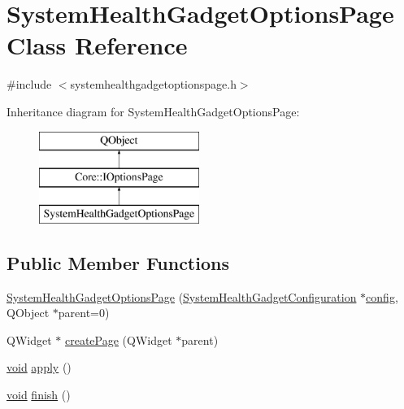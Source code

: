 \hypertarget{class_system_health_gadget_options_page}{\section{System\-Health\-Gadget\-Options\-Page Class Reference}
\label{class_system_health_gadget_options_page}
}


{\ttfamily \#include $<$systemhealthgadgetoptionspage.\-h$>$}

Inheritance diagram for System\-Health\-Gadget\-Options\-Page\-:\begin{figure}[H]
\begin{center}
\leavevmode
\includegraphics[height=3.000000cm]{class_system_health_gadget_options_page}
\end{center}
\end{figure}
\subsection*{Public Member Functions}
\begin{DoxyCompactItemize}
\item 
\hyperlink{group___system_health_plugin_gaa498d06c1c8158466c564b455b1044dc}{System\-Health\-Gadget\-Options\-Page} (\hyperlink{class_system_health_gadget_configuration}{System\-Health\-Gadget\-Configuration} $\ast$\hyperlink{deflate_8c_a4473b5227787415097004fd39f55185e}{config}, Q\-Object $\ast$parent=0)
\item 
Q\-Widget $\ast$ \hyperlink{group___system_health_plugin_ga6ac5a910e1fb73f88186c7602a7425b0}{create\-Page} (Q\-Widget $\ast$parent)
\item 
\hyperlink{group___u_a_v_objects_plugin_ga444cf2ff3f0ecbe028adce838d373f5c}{void} \hyperlink{group___system_health_plugin_gaff59ee5d1057c119bc98e72b972cdc77}{apply} ()
\item 
\hyperlink{group___u_a_v_objects_plugin_ga444cf2ff3f0ecbe028adce838d373f5c}{void} \hyperlink{group___system_health_plugin_gabcd1e79513ea408e8c9c6ab98baf6d7f}{finish} ()
\end{DoxyCompactItemize}


